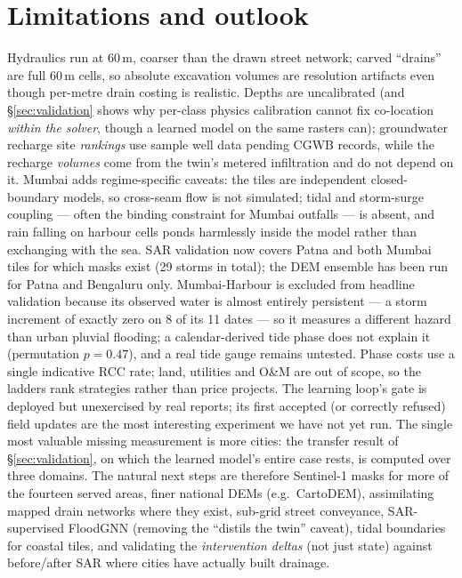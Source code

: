 \documentclass[10pt]{article}
\begin{document}
\section{Limitations and outlook}
Hydraulics run at 60\,m, coarser than the drawn street network; carved ``drains'' are full
60\,m cells, so absolute excavation volumes are resolution artifacts even though per-metre drain
costing is realistic. Depths are uncalibrated (and \S\ref{sec:validation} shows why per-class
physics calibration cannot fix co-location \emph{within the solver}, though a learned model on the
same rasters can); groundwater recharge site \emph{rankings} use sample well data pending CGWB
records, while the recharge \emph{volumes} come from the twin's metered infiltration and do not
depend on it. Mumbai adds regime-specific caveats: the tiles are independent closed-boundary models, so
cross-seam flow is not simulated; tidal and storm-surge coupling --- often the binding constraint
for Mumbai outfalls --- is absent, and rain falling on harbour cells ponds harmlessly inside the
model rather than exchanging with the sea. SAR validation now covers Patna and both Mumbai tiles for
which masks exist (29 storms in total); the DEM ensemble has been run for Patna and Bengaluru
only. Mumbai-Harbour is excluded from headline validation because its observed water is almost
entirely persistent --- a storm increment of exactly zero on 8 of its 11 dates --- so it measures
a different hazard than urban pluvial flooding; a calendar-derived tide phase does not explain it
(permutation $p=0.47$), and a real tide gauge remains untested. Phase costs use a single indicative RCC rate;
land, utilities and O\&M are out of scope, so the ladders rank strategies rather than price
projects. The learning loop's gate is deployed but unexercised by real reports; its first
accepted (or correctly refused) field updates are the most interesting experiment we have not yet
run. The single most valuable missing measurement is more cities: the transfer result of
\S\ref{sec:validation}, on which the learned model's entire case rests, is computed over three
domains. The natural next steps are therefore Sentinel-1 masks for more of the fourteen served
areas, finer national DEMs (e.g.\ CartoDEM), assimilating mapped drain
networks where they exist, sub-grid street conveyance, SAR-supervised FloodGNN (removing the
``distils the twin'' caveat), tidal boundaries for coastal tiles, and validating the
\emph{intervention deltas} (not just state) against before/after SAR where cities have actually
built drainage.
\end{document}
